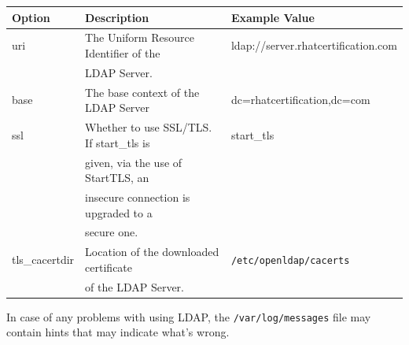 \noindent
\begin{tabular}{lll}
	\toprule
	\textbf{Option} &\textbf{Description} &\textbf{Example Value}\\
	\midrule
	uri &The Uniform Resource Identifier of the  &ldap://server.rhatcertification.com \\
	&LDAP Server. & \\
	base &The base context of the LDAP Server &dc=rhatcertification,dc=com \\
	ssl &Whether to use SSL/TLS. If start\_tls is &start\_tls \\
	&given, via the use of StartTLS, an & \\
	&insecure connection is upgraded to a &\\
	& secure one. &\\
	tls\_cacertdir &Location of the downloaded certificate &\verb|/etc/openldap/cacerts| \\
	&of the LDAP Server. &\\
	\bottomrule
\end{tabular}

In case of any problems with using LDAP, the \verb|/var/log/messages| file may contain hints that may indicate what's wrong. 